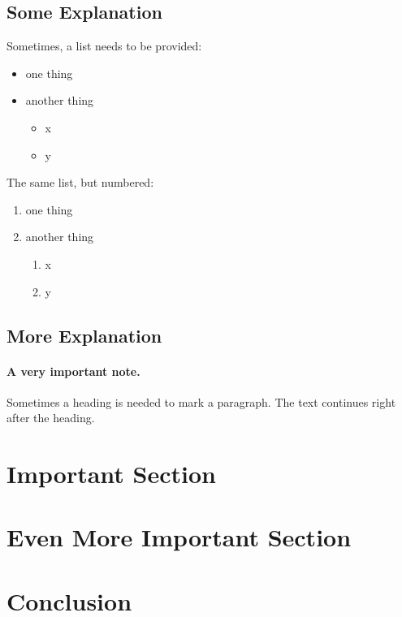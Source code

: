 \documentclass[10pt,twoside,english,a4paper]{article}
\begin{document}
\subsection{Some Explanation} \label{another:some}

Sometimes, a list needs to be provided:

\begin{itemize}
\item one thing
\item another thing
	\begin{itemize}
	\item x
	\item y
	\end{itemize}
\end{itemize}

The same list, but numbered:

\begin{enumerate}
\item one thing
\item another thing
	\begin{enumerate}
	\item x
	\item y
	\end{enumerate}
\end{enumerate}


\subsection{More Explanation} \label{another:more}

\paragraph{A very important note.}
Sometimes a heading is needed to mark a paragraph. The text continues right after the heading.



\section{Important Section} \label{important}




\section{Even More Important Section} \label{more_important}




\section{Conclusion} \label{conclusion} %






\end{document}
